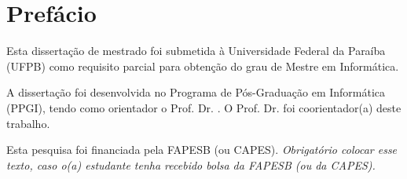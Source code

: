\chapter*{Prefácio}

Esta dissertação de mestrado foi submetida à Universidade Federal da Paraíba (UFPB) como requisito parcial para obtenção do grau de Mestre em Informática. 

A dissertação foi desenvolvida no Programa de Pós-Graduação em Informática (PPGI),  tendo como orientador o Prof. Dr. \textbf{\thesisAdvisor}.
\ifdefined\thesisCoAdvisor
O Prof. Dr. \textbf{\thesisCoAdvisor} foi coorientador(a) deste trabalho. 
\fi

Esta pesquisa foi financiada pela FAPESB (ou CAPES). \textit{Obrigatório colocar esse texto, caso o(a) estudante tenha recebido bolsa da FAPESB (ou da CAPES).}

\cleardoublepage